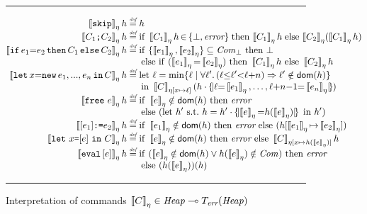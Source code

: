 \documentclass{LMCS}
\theoremstyle{remark}
\newcommand{\Com}{\ensuremath{\mathit{Com}}\xspace}
\newcommand{\ERR}{\ensuremath{\mbox{\it error}}\xspace}
\newcommand{\UNQUOTE}[1]{\SYN{eval}\,{#1}}
\newcommand{\SYN}[1]{\ensuremath{\texttt{#1}}}
\renewcommand{\l}{\ensuremath{\ell}\xspace}
\newcommand{\defeq}{\ensuremath{\stackrel{\mbox{\tiny \it def}}{=}}}
\newcommand{\ignore}[1]{}
\newcommand{\recselect}[2]{\ensuremath{{#1}({#2})}}  \newcommand{\PROJ}[2]{\ensuremath{\pi_{#1}(#2)}}
\newcommand{\record}[1]{\ensuremath{\left.\!\{\!|{#1}|\!\}\right.\!}}
\newcommand{\dom}[1]{\ensuremath{\mathsf{dom}({#1})}}
\newcommand{\lift}[1]{\ensuremath{#1_\bot}}
\newcommand{\COMB}{\ensuremath{\cdot}}
\newcommand{\TERR}{\ensuremath{T_\textit{err}}\xspace}
\newcommand{\Nats}{\ensuremath{\mathit{Nats}^{\scriptsize +}}\xspace}
\newcommand{\IMPLIES}{\ensuremath{\Rightarrow}}
\newcommand{\sto}{\ensuremath{\multimap}}
\newcommand{\key}[1]{\ensuremath{\mathrm{#1}}\xspace}
\newcommand{\den}[1]{\left\llbracket #1
  \right\rrbracket}
\newcommand{\EXPden}[1]{\ensuremath{\den{#1}}}
\begin{document}
\begin{figure*}[t]
\hrule
\vspace{-2mm}
\begin{align*}
\den{\SYN{skip}}_\eta h & 
\defeq h
\\[-1.5mm]
\den{C_1\SYN{;}C_2}_\eta h &
\defeq \key{if}\;\den{C_1}_\eta h\,{\in}\,\{\bot,\ERR\}\;\key{then}\,\den{C_1}_\eta h\;\key{else}\,\den{C_2}_\eta\! (\den{C_1}_\eta h)
\\[-1.5mm]
\den{\SYN{if}\,e_1{=}e_2\,\SYN{then}\,C_1\,\SYN{else}\,C_2}_\eta h &
\defeq
\key{if}~\{\EXPden{e_1}_\eta, \EXPden{e_2}_\eta\}\subseteq\lift{\Com}~\key{then}~\bot~\\[-1.5mm]
&\quad\;\;\key{else}~\key{if}~(\EXPden{e_1}_\eta{=}\EXPden{e_2}_\eta)~\key{then}~\den{C_1}_\eta h~\key{else}~\den{C_2}_\eta h
\\[-1.5mm]
\den{\SYN{let}\,x{=}\SYN{new}\,e_1,...,e_{n}\,\SYN{in}\,C}_\eta h &
\defeq \key{let}~\l = 
\min \{\l \mid 
  \forall \l'\ignore{\in\Nats}.\, (\l {\leq} \l'{<} \l{+}n) \IMPLIES \l' \notin \dom{h}\}\\[-1.5mm]
&\quad\;\; \key{in}~\den{C}_{\eta[x\mapsto\l]}
(h\COMB\record{\l{=}\EXPden{e_1}_\eta, \ldots, \l{+}n{-}1{=}\EXPden{e_n}_\eta})
\\[-1.5mm]
\den{\SYN{free}~e}_\eta h &
\defeq 
\key{if}~\EXPden{e}_\eta\notin\dom h~\key{then}~\ERR\\[-1.5mm]
&\quad\;\; \key{else}~(\key{let}~h'~\text{s.t.}~h=h'\COMB\record{\EXPden{e}_\eta{=}h(\EXPden{e}_\eta)}~\key{in}~h')
\\[-1.5mm]
\den{[e_1]\SYN{:=}e_2}_\eta h &
\defeq   
\key{if}~\EXPden{e_1}_\eta\notin\dom h~\key{then}~\ERR~\key{else}~(h[\EXPden{e_1}_\eta{\mapsto}\EXPden{e_2}_\eta])
\\[-1.5mm]
\den{\SYN{let}~x\SYN{=}[e]~\SYN{in}~C}_\eta h &
\defeq
\key{if}~\EXPden{e}_\eta\notin\dom h~\key{then}~\ERR~\key{else}~\den{C}_{\eta[x\mapsto \recselect{h}{\EXPden{e}_\eta}]}h
\\[-1.5mm]
\den{\UNQUOTE [e]}_\eta h &
\defeq
\key{if}~(\EXPden{e}_\eta\notin \dom h \vee \recselect{h}{\EXPden{e}_\eta} \notin \Com)~\key{then}~\ERR\\[-1.5mm]
&\quad\;\;\key{else}~
(h(\EXPden{e}_\eta))(h)
\end{align*}
\vspace{-4mm}
\hrule
\caption{\label{fig:Interpretation}Interpretation of commands $\den{C}_\eta\in\Heap \sto \TERR(\Heap)$}
\end{figure*}
\end{document}
